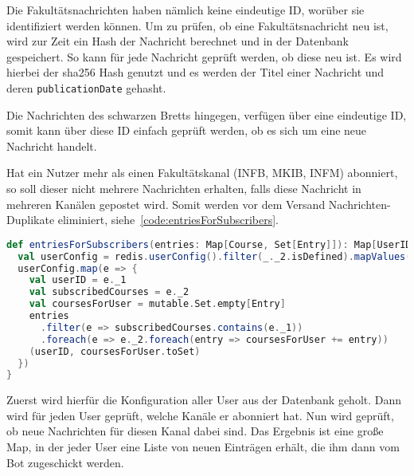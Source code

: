 Die Fakultätsnachrichten haben nämlich keine eindeutige ID, worüber sie identifiziert werden können. Um zu prüfen, ob eine Fakultätsnachricht neu ist, wird zur Zeit ein Hash der Nachricht berechnet und in der Datenbank gespeichert. So kann für jede Nachricht geprüft werden, ob diese neu ist. Es wird hierbei der sha256 Hash genutzt und es werden der Titel einer Nachricht und deren \texttt{publicationDate} gehasht.

Die Nachrichten des schwarzen Bretts hingegen, verfügen über eine eindeutige ID, somit kann über diese ID einfach geprüft werden, ob es sich um eine neue Nachricht handelt.

Hat ein Nutzer mehr als einen Fakultätskanal (INFB, MKIB, INFM) abonniert, so soll dieser nicht mehrere Nachrichten erhalten, falls diese Nachricht in mehreren Kanälen gepostet wird. Somit werden vor dem Versand Nachrichten-Duplikate eliminiert, siehe~\autoref{code:entriesForSubscribers}.

\begin{lstlisting}[language=scala, style=scala, caption={Verteilung der Nachrichten auf die Subscriber und Eliminierung von Duplikaten}, label={code:entriesForSubscribers}]
def entriesForSubscribers(entries: Map[Course, Set[Entry]]): Map[UserID, Set[Entry]] = {
  val userConfig = redis.userConfig().filter(_._2.isDefined).mapValues(_.get)
  userConfig.map(e => {
    val userID = e._1
    val subscribedCourses = e._2
    val coursesForUser = mutable.Set.empty[Entry]
    entries
      .filter(e => subscribedCourses.contains(e._1))
      .foreach(e => e._2.foreach(entry => coursesForUser += entry))
    (userID, coursesForUser.toSet)
  })
}
\end{lstlisting}

Zuerst wird hierfür die Konfiguration aller User aus der Datenbank geholt. Dann wird für jeden User geprüft, welche Kanäle er abonniert hat. Nun wird geprüft, ob neue Nachrichten für diesen Kanal dabei sind. Das Ergebnis ist eine große Map, in der jeder User eine Liste von neuen Einträgen erhält, die ihm dann vom Bot zugeschickt werden.
